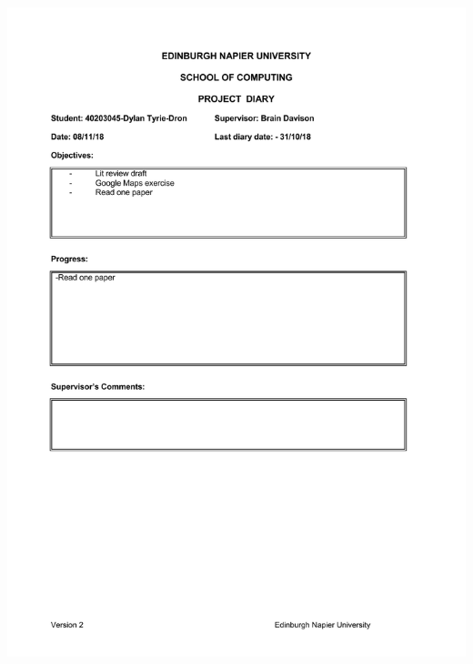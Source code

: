 \documentclass[12pt,a4paper]{article}
\begin{document}
\begin{appendices}
\includegraphics[width=\textwidth,height=\textheight,keepaspectratio]{project_diary_6th_entry.pdf}

\end{appendices}
\end{document}
